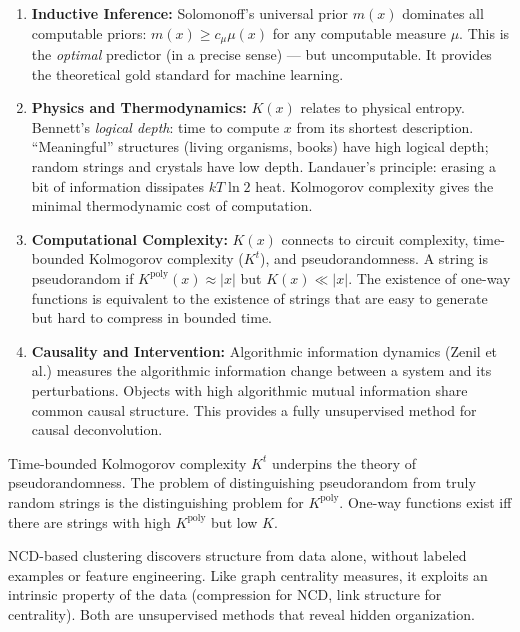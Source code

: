 \begin{enumerate}
\item \textbf{Inductive Inference:} Solomonoff's universal prior $m(x)$ dominates all computable priors: $m(x) \ge c_\mu \mu(x)$ for any computable measure $\mu$. This is the \emph{optimal} predictor (in a precise sense) --- but uncomputable. It provides the theoretical gold standard for machine learning.

\item \textbf{Physics and Thermodynamics:} $K(x)$ relates to physical entropy. Bennett's \emph{logical depth}: time to compute $x$ from its shortest description. ``Meaningful'' structures (living organisms, books) have high logical depth; random strings and crystals have low depth. Landauer's principle: erasing a bit of information dissipates $kT \ln 2$ heat. Kolmogorov complexity gives the minimal thermodynamic cost of computation.

\item \textbf{Computational Complexity:} $K(x)$ connects to circuit complexity, time-bounded Kolmogorov complexity ($K^t$), and pseudorandomness. A string is pseudorandom if $K^{\text{poly}}(x) \approx |x|$ but $K(x) \ll |x|$. The existence of one-way functions is equivalent to the existence of strings that are easy to generate but hard to compress in bounded time.

\item \textbf{Causality and Intervention:} Algorithmic information dynamics (Zenil et al.) measures the algorithmic information change between a system and its perturbations. Objects with high algorithmic mutual information share common causal structure. This provides a fully unsupervised method for causal deconvolution.
\end{enumerate}

Time-bounded Kolmogorov complexity $K^t$ underpins the theory of pseudorandomness. The problem of distinguishing pseudorandom from truly random strings is the distinguishing problem for $K^{\text{poly}}$. One-way functions exist iff there are strings with high $K^{\text{poly}}$ but low $K$.

NCD-based clustering discovers structure from data alone, without labeled examples or feature engineering. Like graph centrality measures, it exploits an intrinsic property of the data (compression for NCD, link structure for centrality). Both are unsupervised methods that reveal hidden organization.

